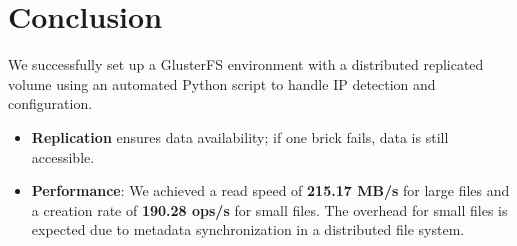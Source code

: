 \documentclass[a4paper,12pt]{article}
\begin{document}
\section{Conclusion}
We successfully set up a GlusterFS environment with a distributed replicated volume using an automated Python script to handle IP detection and configuration.
\begin{itemize}
    \item \textbf{Replication} ensures data availability; if one brick fails, data is still accessible.
    \item \textbf{Performance}: We achieved a read speed of \textbf{215.17 MB/s} for large files and a creation rate of \textbf{190.28 ops/s} for small files. The overhead for small files is expected due to metadata synchronization in a distributed file system.
\end{itemize}
\end{document}
